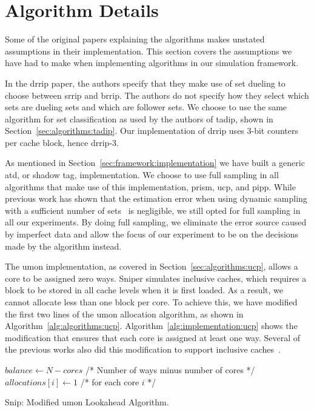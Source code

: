 \section{Algorithm Details}
\label{sec:framework:algorithms}

Some of the original papers explaining the algorithms makes unstated assumptions in their implementation.
This section covers the assumptions we have had to make when implementing algorithms in our simulation framework.

In the \gls{drrip} paper, the authors specify that they make use of set dueling to choose between \gls{srrip} and \gls{brrip}.
The authors do not specify how they select which sets are dueling sets and which are follower sets.
We choose to use the same algorithm for set classification as used by the authors of \gls{tadip}, shown in Section~\ref{sec:algorithms:tadip}.
Our implementation of \gls{drrip} uses 3-bit counters per cache block, hence \gls{drrip}-3.

As mentioned in Section~\ref{sec:framework:implementation} we have built a generic \gls{atd}, or shadow tag, implementation.
We choose to use full sampling in all algorithms that make use of this implementation, \gls{prism}, \gls{ucp}, and \gls{pipp}.
While previous work has shown that the estimation error when using dynamic sampling with a sufficient number of sets~\cite{Jaleel2008} is negligible, we still opted for full sampling in all our experiments.
By doing full sampling, we eliminate the error source caused by imperfect data and allow the focus of our experiment to be on the decisions made by the algorithm instead.

The \gls{umon} implementation, as covered in Section~\ref{sec:algorithms:ucp}, allows a core to be assigned zero ways.
Sniper simulates inclusive caches, which requires a block to be stored in all cache levels when it is first loaded.
As a result, we cannot allocate less than one block per core.
To achieve this, we have modified the first two lines of the \gls{umon} allocation algorithm, as shown in Algorithm~\ref{alg:algorithms:ucp}.
Algorithm~\ref{alg:implementation:ucp} shows the modification that ensures that each core is assigned at least one way.
Several of the previous works also did this modification to support inclusive caches~\cite{Qureshi2006,Xie2009}.

\begin{algorithm}[ht]
\begin{algorithmic}[1]
\State $balance\gets N - cores $ /* Number of ways minus number of cores */
\State $allocations[i]\gets 1$ /* for each core $i$ */
\end{algorithmic}
\caption{Snip: Modified \gls{umon} Lookahead Algorithm.}
\label{alg:implementation:ucp}
\end{algorithm}

